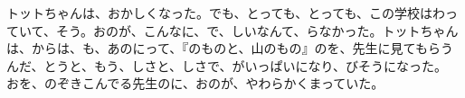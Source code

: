 トットちゃんは、おかしくなった。でも、とっても、とっても、この学校はわっていて、そう。おのが、こんなに、で、しいなんて、らなかった。トットちゃんは、からは、も、あのにって、『のものと、山のもの』のを、先生に見てもらうんだ、とうと、もう、しさと、しさで、がいっぱいになり、びそうになった。 おを、のぞきこんでる先生のに、おのが、やわらかくまっていた。


